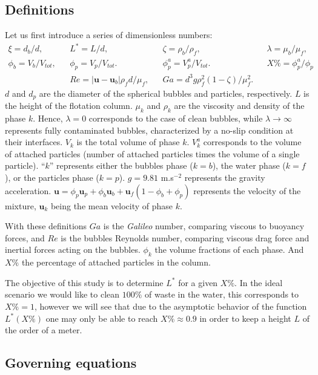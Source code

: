 \subsection{Definitions}
Let us first introduce a series of dimensionless numbers: 
\begin{align*}
    \xi = d_b / d,
    && L^* = L / d,
    && \zeta = \rho_b / \rho_f,
    && \lambda = \mu_b / \mu_f,\\
    \phi_b = V_b/V_{tot},
    && \phi_p = V_p/V_{tot}.
    && \phi_p^a = V_p^a/V_{tot}.
    && X\% = \phi_p^a /\phi_p\\
    &&
    Re = |\textbf{u} - \textbf{u}_b|\rho_f d /\mu_f ,
    && Ga = d^3 g\rho_f^2 (1-\zeta)/\mu_f^2. 
\end{align*}
$d$ and $d_p$ are the diameter of the spherical bubbles and particles, respectively.
$L$ is the height of the flotation column. 
$\mu_k$  and $\rho_k$ are the viscosity and density of the phase $k$. 
Hence, $\lambda = 0$ corresponds to the case of clean bubbles, while $\lambda \to\infty$ represents fully contaminated bubbles, characterized by a no-slip condition at their interfaces.
$V_k$ is the total volume of phase $k$. 
$V^a_k$ corresponds to the volume of attached particles (number of attached particles times the volume of a single particle). 
``$k$'' represents either the bubbles phase ($k=b$), the water phase ($k=f$), or the particles phase ($k=p$).
$g = 9.81$ m.s$^{-2}$ represents the gravity acceleration. 
$\textbf{u} = \phi_p \textbf{u}_p + \phi_b \textbf{u}_b + \textbf{u}_f(1-\phi_b+\phi_p)$ represents the velocity of the mixture, $\textbf{u}_k$ being the mean velocity of phase $k$.

With these definitions $Ga$ is the \textit{Galileo} number, comparing viscous to buoyancy forces, and $Re$ is the bubbles Reynolds number, comparing viscous drag force and inertial forces acting on the bubbles.
$\phi_k$ the volume fractions of each phase. 
And $X\% $ the percentage of attached particles in the column. 

The objective of this study is to determine $L^*$ for a given $X\%$.
In the ideal scenario we would like to clean $100\%$ of waste in the water, this corresponds to $X\%=1$, however we will see that due to the asymptotic behavior of the function $L^* (X\%)$ one may only be able to reach $X\% \approx 0.9$ in order to keep a height $L$ of the order of a meter. 

\subsection{Governing equations}

